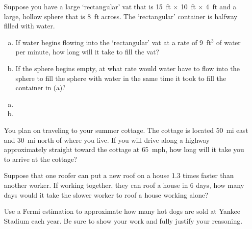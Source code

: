 \documentclass[11pt,letterpaper]{article}
\begin{document}

 Suppose you have a large `rectangular' vat that is 15~ft $\times$ 10~ft $\times$ 4~ft and a large, hollow sphere that is 8~ft across. The `rectangular' container is halfway filled with water. 
	\begin{enumerate}[(a)]
	\item If water begins flowing into the `rectangular' vat at a rate of 9~ft$^3$ of water per minute, how long will it take to fill the vat?
	\item If the sphere begins empty, at what rate would water have to flow into the sphere to fill the sphere with water in the same time it took to fill the container in (a)?
	\end{enumerate} \pspace

\sol 
\begin{enumerate}[(a)]
\item 
\item 
\end{enumerate}



\newpage



 You plan on traveling to your summer cottage. The cottage is located 50~mi east and 30~mi north of where you live. If you will drive along a highway approximately straight toward the cottage at 65~mph, how long will it take you to arrive at the cottage? \pspace

\sol 



\newpage



 Suppose that one roofer can put a new roof on a house 1.3 times faster than another worker. If working together, they can roof a house in 6 days, how many days would it take the slower worker to roof a house working alone? \pspace

\sol 



\newpage



 Use a Fermi estimation to approximate how many hot dogs are sold at Yankee Stadium each year. Be sure to show your work and fully justify your reasoning. \pspace

\sol 
\end{document}
